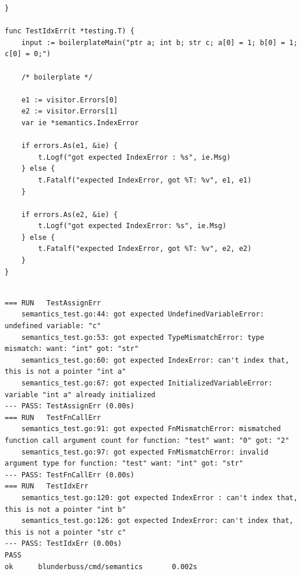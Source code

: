 \begin{lstlisting}[caption={Testy reguł parsera}, label={lst:tst-wizyty}, morekeywords={func, nil, any}]
}

func TestIdxErr(t *testing.T) {
    input := boilerplateMain("ptr a; int b; str c; a[0] = 1; b[0] = 1; c[0] = 0;")

	/* boilerplate */

    e1 := visitor.Errors[0]
    e2 := visitor.Errors[1]
    var ie *semantics.IndexError

    if errors.As(e1, &ie) {
		t.Logf("got expected IndexError : %s", ie.Msg)
    } else {
		t.Fatalf("expected IndexError, got %T: %v", e1, e1)
    }

    if errors.As(e2, &ie) {
		t.Logf("got expected IndexError: %s", ie.Msg)
    } else {
		t.Fatalf("expected IndexError, got %T: %v", e2, e2)
    }
}


\end{lstlisting}

\begin{lstlisting}[caption={Wyniki wybranych testów}, label={lst:tst-wyniki}]
=== RUN   TestAssignErr
    semantics_test.go:44: got expected UndefinedVariableError: undefined variable: "c"
    semantics_test.go:53: got expected TypeMismatchError: type mismatch: want: "int" got: "str"
    semantics_test.go:60: got expected IndexError: can't index that, this is not a pointer "int a"
    semantics_test.go:67: got expected InitializedVariableError: variable "int a" already initialized
--- PASS: TestAssignErr (0.00s)
=== RUN   TestFnCallErr
    semantics_test.go:91: got expected FnMismatchError: mismatched function call argument count for function: "test" want: "0" got: "2"
    semantics_test.go:97: got expected FnMismatchError: invalid argument type for function: "test" want: "int" got: "str"
--- PASS: TestFnCallErr (0.00s)
=== RUN   TestIdxErr
    semantics_test.go:120: got expected IndexError : can't index that, this is not a pointer "int b"
    semantics_test.go:126: got expected IndexError: can't index that, this is not a pointer "str c"
--- PASS: TestIdxErr (0.00s)
PASS
ok      blunderbuss/cmd/semantics       0.002s
\end{lstlisting}
